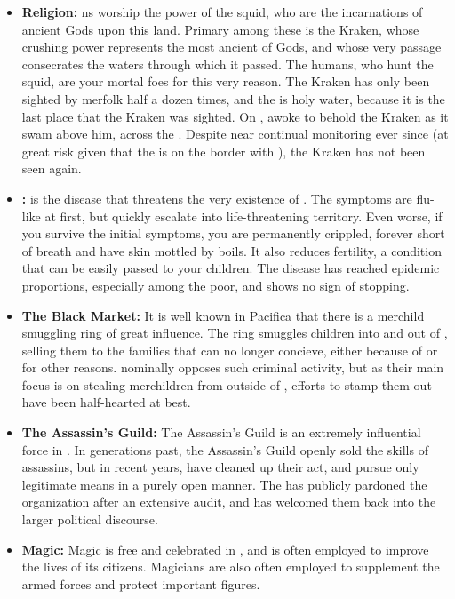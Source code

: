 \documentclass[blue]{NeptuneBall}
\begin{document}
\begin{itemize}
  \item {\bf Religion:} \pPacifica{}ns worship the power of the squid, who are the incarnations of ancient Gods upon this land. Primary among these is the Kraken, whose crushing power represents the most ancient of Gods, and whose very passage consecrates the waters through which it passed. The humans, who hunt the squid, are your mortal foes for this very reason. The Kraken has only been sighted by merfolk half a dozen times, and the \pGazaStrip{} is holy water, because it is the last place that the Kraken was sighted. On \cKraken{\MYname}, \cLiar{\MYname} awoke to behold the Kraken as it swam above him, across the \pGazaStrip{}. Despite near continual monitoring ever since (at great risk given that the \pGazaStrip{} is on the border with \pAtlantis{}), the Kraken has not been seen again.
  \item {\bf \cPolio{}:} \cPolio{} is the disease that threatens the very existence of \pPacifica{}. The symptoms are flu-like at first, but quickly escalate into life-threatening territory. Even worse, if you survive the initial symptoms, you are permanently crippled, forever short of breath and have skin mottled by boils. It also reduces fertility, a condition that can be easily passed to your children. The disease has reached epidemic proportions, especially among the poor, and shows no sign of stopping. 
  \item {\bf The Black Market:} It is well known in Pacifica that there is a merchild smuggling ring of great influence. The ring smuggles children into and out of \pPacifica{}, selling them to the families that can no longer concieve, either because of \cPolio{} or for other reasons. \cPacificanRuler{\King} \cPacificanRuler{} nominally opposes such criminal activity, but as their main focus is on stealing merchildren from outside of \pPacifica{}, efforts to stamp them out have been half-hearted at best.
  \item {\bf The Assassin's Guild:} The Assassin's Guild is an extremely influential force in \pPacifica{}. In generations past, the Assassin's Guild openly sold the skills of assassins, but in recent years, have cleaned up their act, and pursue only legitimate means in a purely open manner. The \cPacificanRuler{\King} has publicly pardoned the organization after an extensive audit, and has welcomed them back into the larger political discourse.
  \item {\bf Magic:} Magic is free and celebrated in \pPacifica{}, and is often employed to improve the lives of its citizens. Magicians are also often employed to supplement the armed forces and protect important figures.
  

\end{itemize}
\end{document}
